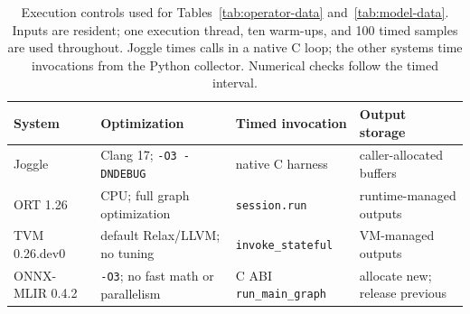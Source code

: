 \begin{table}[!htbp]
  \caption{Execution controls used for Tables~\ref{tab:operator-data}
  and~\ref{tab:model-data}. Inputs are resident; one execution thread, ten
  warm-ups, and 100 timed samples are used throughout. Joggle times calls in a
  native C loop; the other systems time invocations from the Python collector.
  Numerical checks follow the timed interval.}
  \label{tab:execution-controls}
  \centering
  \scriptsize
  \setlength{\tabcolsep}{5pt}
  \begin{tabular*}{\textwidth}{@{\extracolsep{\fill}}llll@{}}
    \toprule
    System & Optimization & Timed invocation & Output storage \\
    \midrule
    Joggle & Clang 17; \texttt{-O3 -DNDEBUG} & native C harness & caller-allocated buffers \\
    ORT 1.26 & CPU; full graph optimization & \texttt{session.run} & runtime-managed outputs \\
    TVM 0.26.dev0 & default Relax/LLVM; no tuning & \texttt{invoke\_stateful} & VM-managed outputs \\
    ONNX-MLIR 0.4.2 & \texttt{-O3}; no fast math or parallelism & C ABI \texttt{run\_main\_graph} & allocate new; release previous \\
    \bottomrule
  \end{tabular*}
\end{table}
